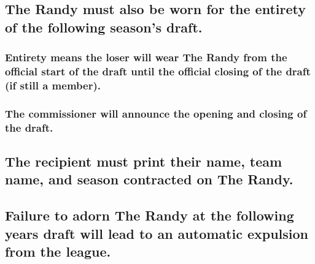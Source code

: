 \documentclass[]{book}
\begin{document}
\hypertarget{the-randy-must-also-be-worn-for-the-entirety-of-the-following-seasons-draft.}{%
\subsection{The Randy must also be worn for the entirety of the following season's draft.}\label{the-randy-must-also-be-worn-for-the-entirety-of-the-following-seasons-draft.}}

\hypertarget{entirety-means-the-loser-will-wear-the-randy-from-the-official-start-of-the-draft-until-the-official-closing-of-the-draft-if-still-a-member.}{%
\subsubsection{Entirety means the loser will wear The Randy from the official start of the draft until the official closing of the draft (if still a member).}\label{entirety-means-the-loser-will-wear-the-randy-from-the-official-start-of-the-draft-until-the-official-closing-of-the-draft-if-still-a-member.}}

\hypertarget{the-commissioner-will-announce-the-opening-and-closing-of-the-draft.}{%
\subsubsection{The commissioner will announce the opening and closing of the draft.}\label{the-commissioner-will-announce-the-opening-and-closing-of-the-draft.}}

\hypertarget{the-recipient-must-print-their-name-team-name-and-season-contracted-on-the-randy.}{%
\subsection{The recipient must print their name, team name, and season contracted on The Randy.}\label{the-recipient-must-print-their-name-team-name-and-season-contracted-on-the-randy.}}

\hypertarget{failure-to-adorn-the-randy-at-the-following-years-draft-will-lead-to-an-automatic-expulsion-from-the-league.}{%
\subsection{Failure to adorn The Randy at the following years draft will lead to an automatic expulsion from the league.}\label{failure-to-adorn-the-randy-at-the-following-years-draft-will-lead-to-an-automatic-expulsion-from-the-league.}}
\end{document}
